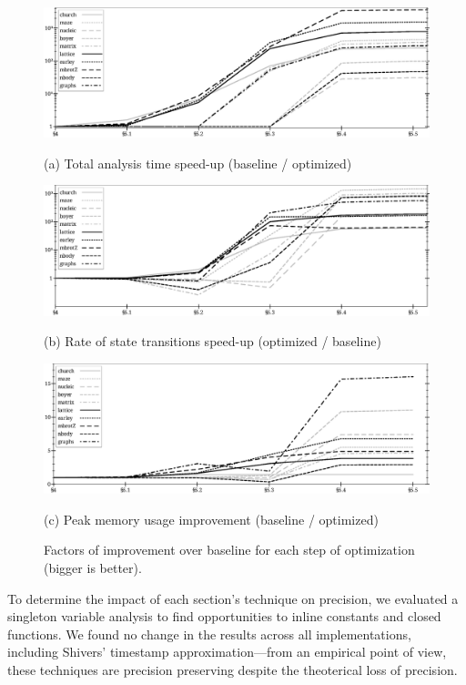 \documentclass[9pt]{sigplanconf} %
\begin{document}
\begin{figure}
\begin{center}
  \includegraphics[width=6.5in]{all-relative-time}

  (a) Total analysis time speed-up (baseline / optimized)

  \vspace{1em}
  \includegraphics[width=6.5in]{all-relative-speed}

  (b) Rate of state transitions speed-up (optimized / baseline)

  \vspace{1em}
  \includegraphics[width=6.5in]{all-relative-space}

  (c) Peak memory usage improvement (baseline / optimized)
\end{center}
\caption{Factors of improvement over baseline for each step of optimization (bigger is better).}
\label{fig:bench-all}
\end{figure}

To determine the impact of each section's technique on precision, we evaluated a singleton variable analysis to find opportunities to inline constants and closed functions.
%
We found no change in the results across all implementations, including Shivers' timestamp approximation---from an empirical point of view, these techniques are precision preserving despite the theoterical loss of precision.
\end{document}
